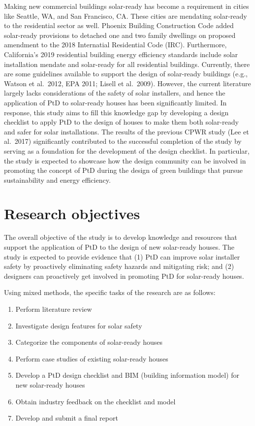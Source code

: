 \documentclass[]{article}
\providecommand{\tightlist}{%
  \setlength{\itemsep}{0pt}\setlength{\parskip}{0pt}}
\begin{document}
Making new commercial buildings solar-ready has become a requirement in
cities like Seattle, WA, and San Francisco, CA. These cities are
mendating solar-ready to the residential sector as well. Phoenix
Building Construction Code added solar-ready provisions to detached one
and two family dwellings on proposed amendment to the 2018 Internatial
Residential Code (IRC). Furthermore, California's 2019 residential
building energy efficiency standards include solar installation mendate
and solar-ready for all residential buildings. Currently, there are some
guidelines available to support the design of solar-ready buildings
(e.g., Watson et al.~2012, EPA 2011; Lisell et al.~2009). However, the
current literature largely lacks considerations of the safety of solar
installers, and hence the application of PtD to solar-ready houses has
been significantly limited. In response, this study aims to fill this
knowledge gap by developing a design checklist to apply PtD to the
design of houses to make them both solar-ready and safer for solar
installations. The results of the previous CPWR study (Lee et al.~2017)
significantly contributed to the successful completion of the study by
serving as a foundation for the development of the design checklist. In
particular, the study is expected to showcase how the design community
can be involved in promoting the concept of PtD during the design of
green buildings that pursue sustainability and energy efficiency.

\hypertarget{research-objectives}{%
\section{Research objectives}\label{research-objectives}}

The overall objective of the study is to develop knowledge and resources
that support the application of PtD to the design of new solar-ready
houses. The study is expected to provide evidence that (1) PtD can
improve solar installer safety by proactively eliminating safety hazards
and mitigating risk; and (2) designers can proactively get involved in
promoting PtD for solar-ready houses.

Using mixed methods, the specific tasks of the research are as follows:

\begin{enumerate}
\def\labelenumi{\arabic{enumi}.}
\tightlist
\item
  Perform literature review
\item
  Investigate design features for solar safety
\item
  Categorize the components of solar-ready houses
\item
  Perform case studies of existing solar-ready houses
\item
  Develop a PtD design checklist and BIM (building information model)
  for new solar-ready houses
\item
  Obtain industry feedback on the checklist and model
\item
  Develop and submit a final report
\end{enumerate}
\end{document}
